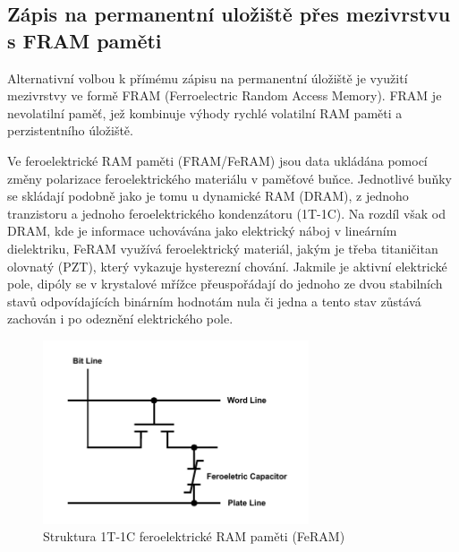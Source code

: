 \subsection{Zápis na permanentní uložiště přes mezivrstvu s FRAM paměti}
Alternativní volbou k přímému zápisu na permanentní úložiště je využití mezivrstvy ve formě FRAM (Ferroelectric Random Access Memory). FRAM je nevolatilní paměť, jež kombinuje výhody rychlé volatilní RAM paměti a perzistentního úložiště.

Ve feroelektrické RAM paměti (FRAM/FeRAM) jsou data ukládána pomocí změny polarizace feroelektrického materiálu v paměťové buňce. Jednotlivé buňky se skládají podobně jako je tomu u dynamické RAM (DRAM), z jednoho tranzistoru a jednoho feroelektrického kondenzátoru (1T-1C). Na rozdíl však od DRAM, kde je informace uchovávána jako elektrický náboj v lineárním dielektriku, FeRAM využívá feroelektrický materiál, jakým je třeba titaničitan olovnatý (PZT), který vykazuje hysterezní chování. Jakmile je aktivní elektrické pole, dipóly se v krystalové mřížce přeuspořádají do jednoho ze dvou stabilních stavů odpovídajících binárním hodnotám nula či jedna a tento stav zůstává zachován i po odeznění elektrického pole. \cite{ieee_feram_ultra_high_density_embedded_mem}

\begin{figure}[h]
    \centering
    \includegraphics[width=0.70\textwidth]{obrazky-figures/fram_t1-c1.pdf}
    
    \caption{Struktura 1T-1C feroelektrické RAM paměti (FeRAM) \cite{researchgate_nonvolatile_memory_technologies}}
    \label{fig:feram-1t-1c}
\end{figure}

